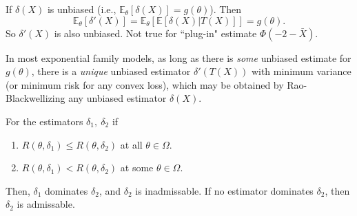 \documentclass[a4paper]{article}
\begin{document}
\begin{note}
	If $\delta(X)$ is unbiased (i.e., $\mathbb{E}_\theta[\delta(X)] = g(\theta)$). Then
	\begin{equation}
		\mathbb{E}_\theta[\delta'(X)]=\mathbb{E}_\theta[\mathbb{E}[\delta(X)|T(X)]] = g(\theta).
	\end{equation}
	So $\delta'(X)$ is also unbiased. Not true for ``plug-in" estimate $\Phi(-2-\bar X)$.
\end{note}

\begin{remark}
	In most exponential family models, as long as there is \emph{some} unbiased estimate for $g(\theta)$, there is a \emph{unique} unbiased estimator $\delta'(T(X))$ with minimum variance (or minimum risk for any convex loss), which may be obtained by Rao-Blackwellizing any unbiased estimator $\delta(X)$.
\end{remark}

\begin{defi}[Admissibility]
	For the estimators $\delta_1, \ \delta_2$ if  
	\begin{enumerate}
		\item $R(\theta,\delta_1) \leq R(\theta,\delta_2)$ at all $\theta \in \Omega$.
		\item $R(\theta,\delta_1) < R(\theta,\delta_2)$ at some $\theta \in \Omega$.
	\end{enumerate}
	Then, $\delta_1$ dominates $\delta_2$, and $\delta_2$ is inadmissable.
	If no estimator dominates $\delta_2$, then $\delta_2$ is admissable.
\end{defi}
\end{document}
